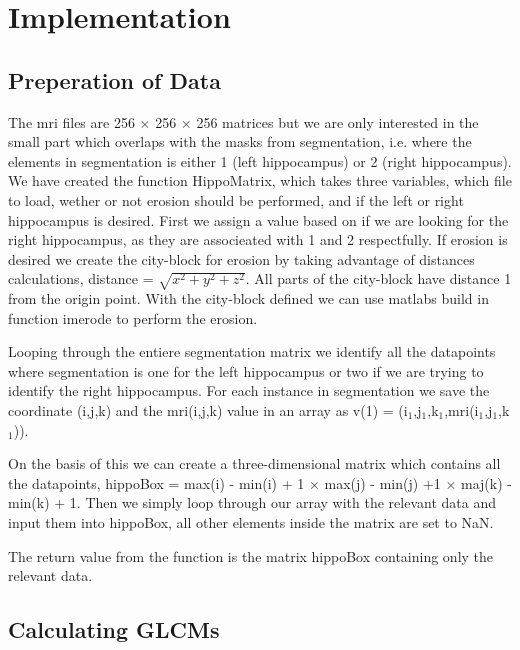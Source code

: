 \chapter{Implementation}

\section{Preperation of Data}
The mri files are 256 $\times$ 256 $\times$ 256 matrices but we are only interested in the small part which overlaps with the masks from segmentation, i.e. where the elements in segmentation is either 1 (left hippocampus) or 2 (right hippocampus).
We have created the function HippoMatrix, which takes three variables, which file to load, wether or not erosion should be performed, and if the left or right hippocampus is desired.
First we assign a value based on if we are looking for the right hippocampus, as they are associeated with 1 and 2 respectfully.
If erosion is desired we create the city-block for erosion by taking advantage of distances calculations, distance = $\sqrt{x^2+y^2+z^2}$. All parts of the city-block have distance 1 from the origin point. With the city-block defined we can use matlabs build in function imerode to perform the erosion. 

Looping through the entiere segmentation matrix we identify all the datapoints where segmentation is one for the left hippocampus or two if we are trying to identify the right hippocampus. For each instance in segmentation we save the coordinate (i,j,k) and the mri(i,j,k) value in an array as v(1) = (i$_1$,j$_1$,k$_1$,mri(i$_1$,j$_1$,k$_1$)).

On the basis of this we can create a three-dimensional matrix which contains all the datapoints, hippoBox = max(i) - min(i) + 1 $\times$ max(j) - min(j) +1 $\times$ maj(k) - min(k) + 1.
Then we simply loop through our array with the relevant data and input them into hippoBox, all other elements inside the matrix are set to NaN. 

The return value from the function is the matrix hippoBox containing only the relevant data.

\section{Calculating GLCMs}

